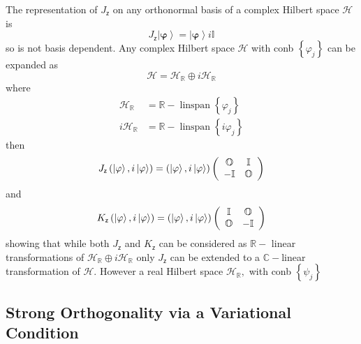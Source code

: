 \documentclass[aps,preprint]{revtex4}%
\begin{document}
The representation of $J_{\mathsf{z}}$ on any orthonormal basis of a complex
Hilbert space $\mathcal{H}$ is
\begin{equation}
J_{\mathsf{z}}\left\vert \mathbf{\varphi}\right\rangle =\left\vert
\mathbf{\varphi}\right\rangle i\mathbb{I}%
\end{equation}
so is not basis dependent. Any complex Hilbert space $\mathcal{H}$ with conb
$\left\{  \varphi_{j}\right\}  $ can be expanded as
\begin{equation}
\mathcal{H=H}_{\mathbb{R}}\oplus i\mathcal{H}_{\mathbb{R}}%
\end{equation}
where
\begin{align}
\mathcal{H}_{\mathbb{R}} &  =\mathbb{R-}\operatorname{linspan}\left\{
\varphi_{j}\right\}  \nonumber\\
i\mathcal{H}_{\mathbb{R}} &  =\mathbb{R-}\operatorname{linspan}\left\{
i\varphi_{j}\right\}
\end{align}
then
\begin{equation}
J_{\mathsf{z}}\left(  \left\vert \mathbf{\varphi}\right\rangle ,i\left\vert
\mathbf{\varphi}\right\rangle \right)  =\left(  \left\vert \mathbf{\varphi
}\right\rangle ,i\left\vert \mathbf{\varphi}\right\rangle \right)  \left(
\begin{array}
[c]{cc}%
\mathbb{O} & \mathbb{I}\\
-\mathbb{I} & \mathbb{O}%
\end{array}
\right)
\end{equation}
and
\begin{equation}
K_{\mathsf{z}}\left(  \left\vert \mathbf{\varphi}\right\rangle ,i\left\vert
\mathbf{\varphi}\right\rangle \right)  =\left(  \left\vert \mathbf{\varphi
}\right\rangle ,i\left\vert \mathbf{\varphi}\right\rangle \right)  \left(
\begin{array}
[c]{cc}%
\mathbb{I} & \mathbb{O}\\
\mathbb{O} & -\mathbb{I}%
\end{array}
\right)
\end{equation}
showing that while both $J_{\mathsf{z}}$ and $K_{\mathsf{z}}$ can be
considered as $\mathbb{R-}$ linear transformations of $\mathcal{H}%
_{\mathbb{R}}\oplus i\mathcal{H}_{\mathbb{R}}$ only $J_{\mathsf{z}}$ can be
extended to a $\mathbb{C-}$linear transformation of $\mathcal{H}$. However a
real Hilbert space $\mathcal{H}_{\mathbb{R}},$ with conb $\left\{  \psi
_{j}\right\}  $

\subsection{Strong Orthogonality via a Variational Condition}
\end{document}
